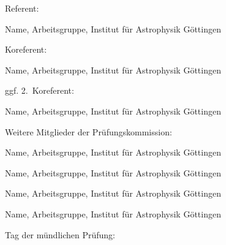 \noindent Referent:

Name, Arbeitsgruppe, Institut für Astrophysik Göttingen
\vspace{\baselineskip}

\noindent Koreferent:

Name, Arbeitsgruppe, Institut für Astrophysik Göttingen
\vspace{\baselineskip}

\noindent ggf. 2.~Koreferent:

Name, Arbeitsgruppe, Institut für Astrophysik Göttingen
\vspace{\baselineskip}

\noindent Weitere Mitglieder der Prüfungskommission:
\vspace{\baselineskip}

Name, Arbeitsgruppe, Institut für Astrophysik Göttingen
\vspace{\baselineskip}

Name, Arbeitsgruppe, Institut für Astrophysik Göttingen
\vspace{\baselineskip}

Name, Arbeitsgruppe, Institut für Astrophysik Göttingen
\vspace{\baselineskip}

Name, Arbeitsgruppe, Institut für Astrophysik Göttingen
\vspace{3\baselineskip}

\noindent Tag der mündlichen Prüfung:


\cleardoublepage


% 
% 
% 



